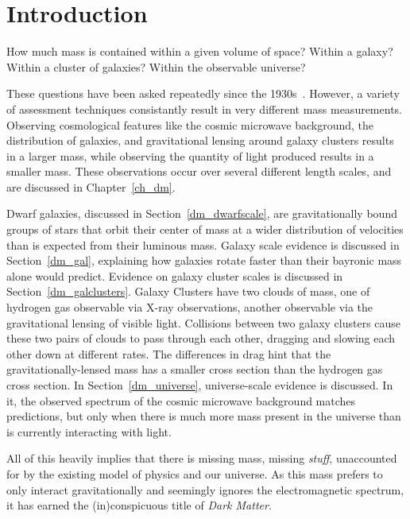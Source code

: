 \cleartooddpage[\thispagestyle{empty}]
\chapter{Introduction}

  How much mass is contained within a given volume of space?
  Within a galaxy?
  Within a cluster of galaxies?
  Within the observable universe?

  These questions have been asked repeatedly since the 1930s~\cite{zwicky1937}.
  However, a variety of assessment techniques consistantly result in very different mass measurements.
  Observing cosmological features like the cosmic microwave background, the distribution of galaxies, and gravitational lensing around galaxy clusters results in a larger mass, while observing the quantity of light produced results in a smaller mass.
  These observations occur over several different length scales, and are discussed in Chapter~\ref{ch_dm}.

  Dwarf galaxies, discussed in Section~\ref{dm_dwarfscale}, are gravitationally bound groups of stars that orbit their center of mass at a wider distribution of velocities than is expected from their luminous mass.
  Galaxy scale evidence is discussed in Section~\ref{dm_gal}, explaining how galaxies rotate faster than their bayronic mass alone would predict.
  Evidence on galaxy cluster scales is discussed in Section~\ref{dm_galclusters}.
  Galaxy Clusters have two clouds of mass, one of hydrogen gas observable via X-ray observations, another observable via the gravitational lensing of visible light.
  Collisions between two galaxy clusters cause these two pairs of clouds to pass through each other, dragging and slowing each other down at different rates.
  The differences in drag hint that the gravitationally-lensed mass has a smaller cross section than the hydrogen gas cross section.
  In Section~\ref{dm_universe}, universe-scale evidence is discussed.
  In it, the observed spectrum of the cosmic microwave background matches predictions, but only when there is much more mass present in the universe than is currently interacting with light.

  All of this heavily implies that there is missing mass, missing \textit{stuff}, unaccounted for by the existing model of physics and our universe.
  As this mass prefers to only interact gravitationally and seemingly ignores the electromagnetic spectrum, it has earned the (in)conspicuous title of \textit{Dark Matter}.

